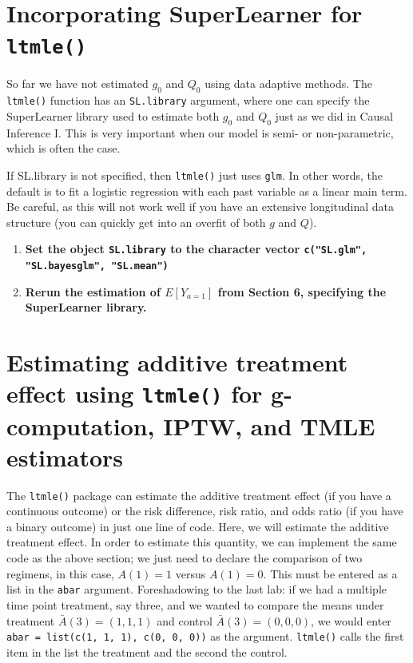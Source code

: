 \documentclass[answers]{exam}
\begin{document}
\section{Incorporating SuperLearner for \texttt{ltmle()}}

So far we have not estimated $g_0$ and $Q_0$ using data adaptive methods. The \texttt{ltmle()} function has an \texttt{SL.library} argument, where one can specify the SuperLearner library used to estimate both $g_0$ and $Q_0$ just as we did in Causal Inference I. This is very important when our model is semi- or non-parametric, which is often the case. 

If SL.library is not specified, then \texttt{ltmle()} just uses \texttt{glm}. In other words, the default is to fit a logistic regression with each past variable as a linear main term. Be careful, as this will not work well if you have an extensive longitudinal data structure (you can quickly get into an overfit of both $g$ and $Q$).

\begin{enumerate}
\item \textbf{Set the object \texttt{SL.library} to the character vector \texttt{c("SL.glm", "SL.bayesglm", "SL.mean")}}
\item \textbf{Rerun the estimation of $E[Y_{a=1}]$ from Section 6, specifying the SuperLearner library.}
\end{enumerate}


\section{Estimating additive treatment effect using \texttt{ltmle()} for g-computation, IPTW, and TMLE estimators}

The \texttt{ltmle()} package can estimate the additive treatment effect (if you have a continuous outcome) or the risk difference, risk ratio, and odds ratio (if you have a binary outcome) in just one line of code. Here, we will estimate the additive treatment effect. In order to estimate this quantity, we can implement the same code as the above section; we just need to declare the comparison of two regimens, in this case, $A(1) = 1$ versus
$A(1) = 0$. This must be entered as a list in the \texttt{abar} argument. Foreshadowing to the last lab: if we had a multiple time point treatment, say three, and we wanted to compare the means under treatment $\bar{A}(3) = (1, 1, 1)$ and control $\bar{A}(3) = (0, 0, 0)$, we would enter \texttt{abar = list(c(1, 1, 1), c(0, 0, 0))} as the argument. \texttt{ltmle()} calls the first item in the list the treatment and the second the control.
\end{document}

